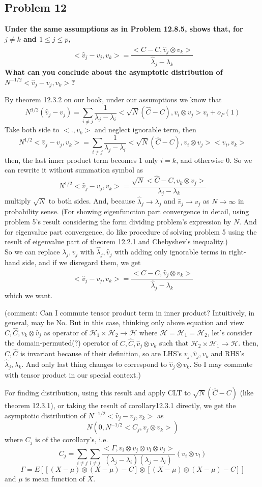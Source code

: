 \documentclass{article}
\begin{document}
\subsection{Problem 12}
\textbf{
Under the same assumptions as in Problem 12.8.5,
shows that, for $j\neq k$ and $1\leq j \leq p$,
\[<\hat{v}_j-v_j, v_k>=\frac{<\hat{C}-C,\hat{v}_j \otimes v_k>}{\hat{\lambda}_j-\lambda_k}\]
What can you conclude about the asymptotic distribution of $N^{-1/2}<\hat{v}_j-v_j,v_k>$?
}

By theorem 12.3.2 on our book, under our assumptions we know that 
\[N^{1/2}(\hat{v}_j-v_j)=\sum_{i\neq j}\frac{1}{\lambda_j-\lambda_i}<\sqrt{N}(\hat{C}-C), v_i\otimes v_j>v_i+o_P(1)\]
Take both side to $<., v_k>$ and neglect ignorable term, then
\[N^{1/2}<\hat{v}_j-v_j,v_k>=\sum_{i\neq j}\frac{1}{\lambda_j-\lambda_i}<\sqrt{N}(\hat{C}-C), v_i\otimes v_j><v_i,v_k>\]
then, the last inner product term becomes 1 only $i=k$, and otherwise 0. So we can rewrite it without summation symbol as 
\[N^{1/2}<\hat{v}_j-v_j,v_k>=\frac{\sqrt{N}<\hat{C}-C, v_k\otimes v_j>}{\lambda_j-\lambda_k}\]
multiply $\sqrt{N}$ to both sides.
And, because $\hat{\lambda}_j\rightarrow\lambda_j$ and $\hat{v}_j\rightarrow v_j$ as $N\rightarrow \infty$
in probability sense.
(For showing eigenfunction part convergence in detail, using problem 5's result considering the form dividing problem's expression by $N$. 
And for eigenvalue part convergence, do like procedure of solving problem 5 using the result of eigenvalue part of theorem 12.2.1 and Chebyshev's inequality.)\\ 
So we can replace $\lambda_j, v_j$ with $\hat{\lambda}_j,\hat{v}_j$ with adding only ignorable terms in right-hand side,
and if we disregard them, we get
\[<\hat{v}_j-v_j, v_k>=\frac{<\hat{C}-C,\hat{v}_j \otimes v_k>}{\hat{\lambda}_j-\lambda_k}\]
which we want. 

(comment: Can I commute tensor product term in inner product? Intuitively, in general, may be No. But in this case,
thinking only above equation and view $C,\hat{C},v_k\otimes\hat{v}_j$ 
as operator of $\mathcal{H}_1\times\mathcal{H}_2\rightarrow\mathcal{H}$ 
where $\mathcal{H}=\mathcal{H}_1=\mathcal{H}_2$,
let's consider the domain-permuted(?) operator of $C,\hat{C},\hat{v}_j\otimes v_k$ 
such that $\mathcal{H}_2\times\mathcal{H}_1\rightarrow\mathcal{H}$.
then, $C, \hat{C}$ is invariant because of their definition, so are LHS's $v_j, \hat{v}_j, v_k$ and RHS's $\hat{\lambda}_j,\lambda_k$.
And only last thing changes to correspond to $\hat{v}_j \otimes v_k$. So I may commute with tensor product in our special context.)

For finding distribution, using this result and apply CLT to $\sqrt{N}(\hat{C}-C)$ (like theorem 12.3.1), or taking the result of corollary12.3.1 directly, 
we get the asymptotic distribution of \(N^{-1/2}<\hat{v}_j-v_j,v_k>\) as
\[N(0, N^{-1/2}<C_j,v_j \otimes v_k>)\]
where $C_j$ is of the corollary's, i.e.
\[C_j=\sum_{i\neq j}\sum_{l\neq j}\frac{<\Gamma,v_i\otimes v_j\otimes v_l\otimes v_j>}
{(\lambda_j-\lambda_i)(\lambda_j-\lambda_l)}(v_i \otimes v_l)\]
\[\Gamma=E[[(X-\mu)\otimes(X-\mu)-C]\otimes[(X-\mu)\otimes(X-\mu)-C]]\]
and $\mu$ is mean function of $X$.
\end{document}

